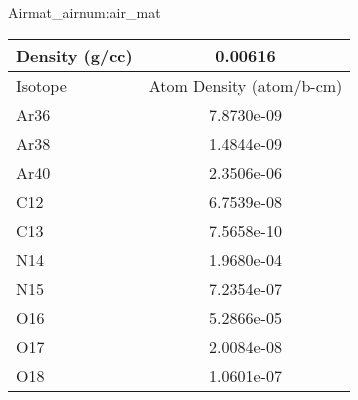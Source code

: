 \begin{matitem}{Air}{mat_air}{num:air_mat}
  \centering
  \begin{tabular}{l c}
    \toprule
    Density (g/cc) & 0.00616 \\
    \midrule
    Isotope & Atom Density (atom/b-cm) \\
    \midrule
    \midrule
Ar36 & 7.8730e-09 \\
Ar38 & 1.4844e-09 \\
Ar40 & 2.3506e-06 \\
C12 & 6.7539e-08 \\
C13 & 7.5658e-10 \\
N14 & 1.9680e-04 \\
N15 & 7.2354e-07 \\
O16 & 5.2866e-05 \\
O17 & 2.0084e-08 \\
O18 & 1.0601e-07 \\

    \bottomrule
  \end{tabular}
\end{matitem}
